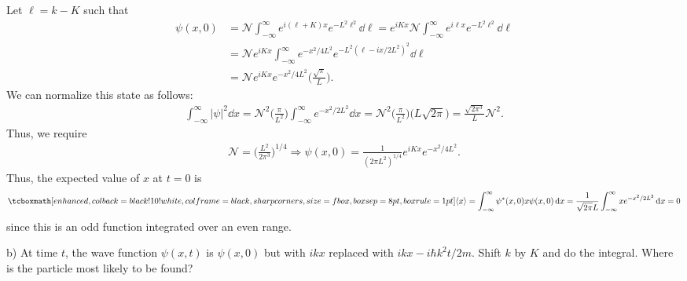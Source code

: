 Let $\ell = k - K$ such that 
\begin{align}
    \label{eq:wave-packet-shift}
    \psi(x,0) &= \mathcal{N} \int_{-\infty}^{\infty} e^{i(\ell + K)x} e^{-L^2\ell^2} \dd{\ell} = e^{iKx} \mathcal{N} \int_{-\infty}^{\infty} e^{i \ell x} e^{-L^2 \ell^2} \dd{\ell} \\
              &= \mathcal{N} e^{iKx} \int_{-\infty}^{\infty} e^{-x^2/4L^2} e^{-L^2(\ell - ix/2L^2)^2} \dd{\ell} \\
              &= \mathcal{N} e^{iKx} e^{-x^2/4L^2} \Big( \frac{\sqrt{\pi}}{L} \Big)
.\end{align}
We can normalize this state as follows:
\begin{eqnarray}
    \label{eq:normalize-state}
    \int_{-\infty}^{\infty} |\psi|^2 \dd{x} = \mathcal{N}^2 \Big( \frac{\pi}{L^2} \Big) \int_{-\infty}^{\infty} e^{-x^2/2L^2} \dd{x} = \mathcal{N}^2 \Big( \frac{\pi}{L^2} \Big) \Big( L\sqrt{2\pi} \Big) = \frac{\sqrt{2 \pi^3}}{L} \mathcal{N}^2
.\end{eqnarray}
Thus, we require
\begin{eqnarray}
    \label{eq:normalization-const}
    \mathcal{N} = \Big( \frac{L^2}{2\pi^3} \Big)^{1/4} \Rightarrow \psi(x,0) = \frac{1}{(2\pi L^2)^{1/4}} e^{iKx} e^{-x^2/4L^2}
.\end{eqnarray}
Thus, the expected value of $x$ at $t = 0$ is
\begin{eqnarray}
    \label{eq:expval-x-t0}
    \eqbox{
    \expval{x} = \int_{-\infty}^{\infty} \psi^{*}(x,0) x \psi(x,0) \dd{x} = \frac{1}{\sqrt{2\pi}L} \int_{-\infty}^{\infty} x e^{-x^2/2L^2} \dd{x} = 0
}
\end{eqnarray}
since this is an odd function integrated over an even range.


b) At time $t$, the wave function $\psi(x,t)$ is $\psi(x,0)$ but with $ikx$ replaced with $ikx - i\hbar k^2t/2m$.
Shift $k$ by $K$ and do the integral.
Where is the particle most likely to be found?

